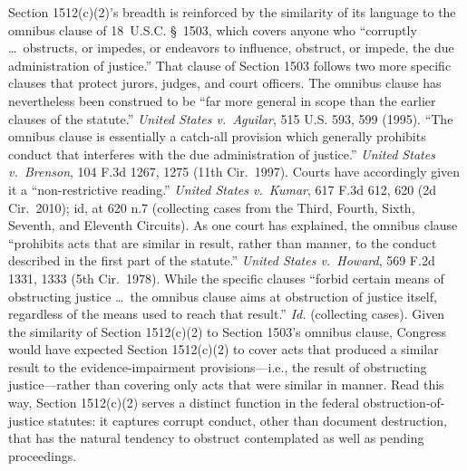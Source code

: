 Section 1512(c)(2)'s breadth is reinforced by the similarity of its language to the omnibus clause of 18~U.S.C. \S~1503, which covers anyone who ``corruptly \dots\ obstructs, or impedes, or endeavors to influence, obstruct, or impede, the due administration of justice.'' That clause of Section 1503 follows two more specific clauses that protect jurors, judges, and court officers.
The omnibus clause has nevertheless been construed to be ``far more general in scope than the earlier clauses of the statute.''
\textit{United States v.\ Aguilar}, 515 U.S. 593, 599 (1995).
``The omnibus clause is essentially a catch-all provision which generally prohibits conduct that interferes with the due administration of justice.''
\textit{United States v.\ Brenson}, 104 F.3d 1267, 1275 (11th Cir.~1997).
Courts have accordingly given it a ``non-restrictive reading.''
\textit{United States v.\ Kumar}, 617 F.3d 612, 620 (2d Cir.~2010); id, at 620 n.7 (collecting cases from the Third, Fourth, Sixth, Seventh, and Eleventh Circuits).
As one court has explained, the omnibus clause ``prohibits acts that are similar in result, rather than manner, to the conduct described in the first part of the statute.''
\textit{United States v.\ Howard}, 569 F.2d 1331, 1333 (5th Cir.~1978).
While the specific clauses ``forbid certain means of obstructing justice \dots\ the omnibus clause aims at obstruction of justice itself, regardless of the means used to reach that result.''
\textit{Id.} (collecting cases).
Given the similarity of Section 1512(c)(2) to Section 1503's omnibus clause, Congress would have expected Section 1512(c)(2) to cover acts that produced a similar result to the evidence-impairment provisions---i.e., the result of obstructing justice---rather than covering only acts that were similar in manner.
Read this way, Section 1512(c)(2) serves a distinct function in the federal obstruction-of-justice statutes: it captures corrupt conduct, other than document destruction, that has the natural tendency to obstruct contemplated as well as pending proceedings.

